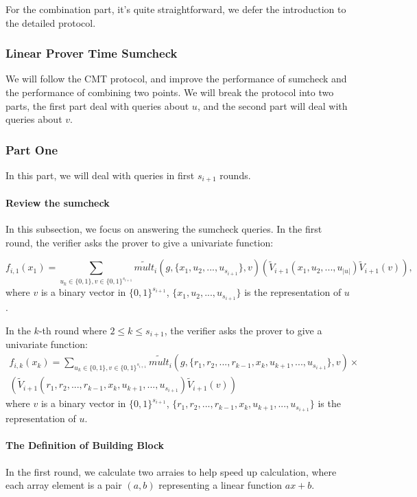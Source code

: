 For the combination part, it's quite straightforward, we defer the introduction to the detailed protocol.

\subsubsection{Linear Prover Time Sumcheck}
We will follow the CMT protocol, and improve the performance of sumcheck and the performance of combining two points. We will break the protocol into two parts, the first part deal with queries about $u$, and the second part will deal with queries about $v$.
\subsubsection{Part One} In this part, we will deal with queries in first $s_{i+1}$ rounds.
\paragraph{Review the sumcheck}
In this subsection, we focus on answering the sumcheck queries. In the first round, the verifier asks the prover to give a univariate function: 

$$f_{i, 1}(x_1)=\sum_{u_{k} \in \{0, 1\}, v \in \{0, 1\}^{s_{i+1}}}\tilde{mult}_{i}(g, \{x_1, u_{2},..., u_{s_{i+1}}\}, v)(\tilde{V}_{i+1}(x_1, u_{2},..., u_{|u|})\tilde{V}_{i+1}(v)),$$
where $v$ is a binary vector in $\{0, 1\}^{s_{i+1}}$, $\{x_1, u_{2},..., u_{s_{i+1}}\}$ is the representation of $u$.

In the $k$-th round where $2\le k\le s_{i+1}$, the verifier asks the prover to give a univariate function:
\begin{align*}
f_{i,k}(x_k)=\sum_{u_k \in \{0, 1\}, v \in \{0, 1\}^{s_{i+1}}}\tilde{mult}_{i}(g, \{r_1,r_2,...,r_{k-1},x_k, u_{k+1},..., u_{s_{i+1}}\}, v)\times\\
(\tilde{V}_{i+1}(r_1,r_2,...,r_{k-1},x_k, u_{k+1},..., u_{s_{i+1}})\tilde{V}_{i+1}(v))
\end{align*}
where $v$ is a binary vector in $\{0, 1\}^{s_{i+1}}$, $\{r_1,r_2,...,r_{k-1},x_k, u_{k+1},..., u_{s_{i+1}}\}$ is the representation of $u$.

\paragraph{The Definition of Building Block}
In the first round, we calculate two arraies to help speed up calculation, where each array element is a pair $(a, b)$ representing a linear function $ax+b$.

